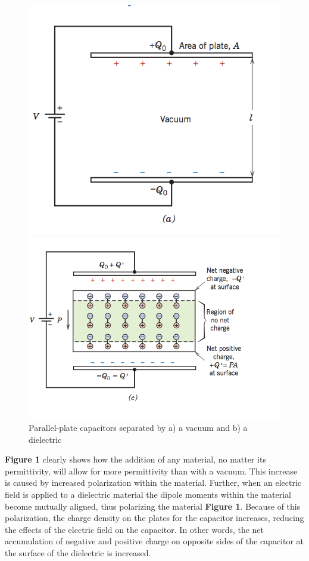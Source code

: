 \documentclass{article}
\begin{document}
\begin{figure}[h!]
	\begin{minipage}{.5\textwidth}
		\centering
		\includegraphics[width=.7\linewidth]{cap.png}
	\end{minipage}
	\begin{minipage}{.5\textwidth}
		\centering
		\includegraphics[width=.87\linewidth]{cap_vacuum.png}
	\end{minipage}
	\caption{Parallel-plate capacitors separated by a) a vacuum and b) a dielectric}
\end{figure}

\textbf{Figure 1} clearly shows how the addition of any material, no matter its permittivity, will allow for more permittivity than with a vacuum. This increase is caused by increased polarization within the material. Further, when an electric field is applied to a dielectric material the dipole moments within the material become mutually aligned, thus polarizing the material \textbf{Figure 1}. Because of this polarization, the charge density on the plates for the capacitor increases, reducing the effects of the electric field on the capacitor. In other words, the net accumulation of negative and positive charge on opposite sides of the capacitor at the surface of the dielectric is increased.
\end{document}
